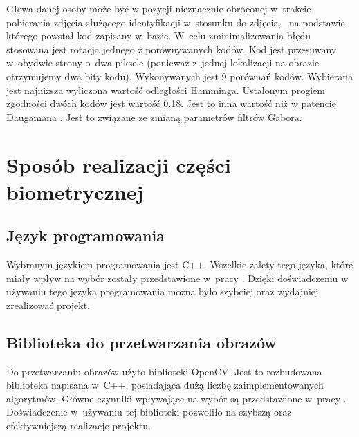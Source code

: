 Głowa danej osoby może być w pozycji nieznacznie obróconej w~trakcie pobierania zdjęcia służącego identyfikacji w~stosunku do zdjęcia, ~na podstawie  którego powstał kod zapisany  w~bazie. W~celu zminimalizowania błędu stosowana jest rotacja jednego z porównywanych kodów. Kod jest przesuwany w~obydwie strony o~dwa piksele (ponieważ z~jednej lokalizacji na obrazie otrzymujemy dwa bity kodu). Wykonywanych jest 9 porównań kodów. Wybierana jest najniższa wyliczona wartość odległości Hamminga. Ustalonym progiem zgodności dwóch kodów jest wartość 0.18. Jest to inna wartość niż w patencie Daugamana \cite{Daugman}. Jest to związane ze zmianą parametrów filtrów Gabora.

\section{Sposób realizacji części biometrycznej}
\label{subsec:realizacjaBio}

\subsection{Język programowania}
\label{sec:jezykProgramowania}
Wybranym językiem programowania jest C++. Wszelkie zalety tego języka, które miały wpływ na wybór zostały przedstawione w~pracy \cite{Gl11}. Dzięki doświadczeniu w używaniu tego języka programowania można było szybciej oraz wydajniej zrealizować projekt.

\subsection{Biblioteka do przetwarzania obrazów}
\label{sec:bibliotekaObrazow}
Do przetwarzaniu obrazów użyto biblioteki OpenCV. Jest to rozbudowana biblioteka napisana w~C++, posiadająca dużą liczbę zaimplementowanych algorytmów. Główne czynniki wpływające na wybór są przedstawione w~pracy \cite{Gl11}. Doświadczenie w~używaniu tej biblioteki pozwoliło na szybszą oraz efektywniejszą realizację projektu.


